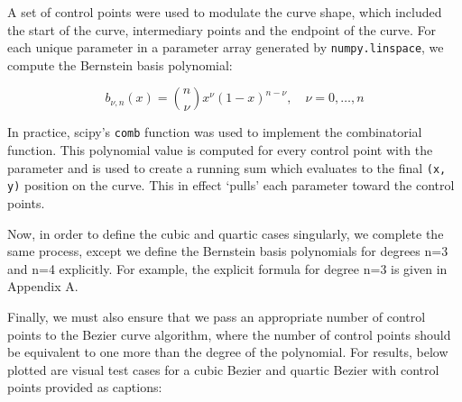 \documentclass[10pt,a4paper]{article}
\begin{document}
A set of control points were used to modulate the curve shape, which included the start of the curve, intermediary points and the endpoint of the curve. For each unique parameter in a parameter array generated by \texttt{numpy.linspace}, we compute the Bernstein basis polynomial:

\begin{equation}
b_{\nu,n}(x) = \binom{n}{\nu} x^{\nu} (1-x)^{n-\nu}, \quad \nu = 0, \ldots, n
\end{equation}

In practice, scipy's \texttt{comb} function was used to implement the combinatorial function. This polynomial value is computed for every control point with the parameter and is used to create a running sum which evaluates to the final \texttt{(x, y)} position on the curve. This in effect ‘pulls’ each parameter toward the control points.

Now, in order to define the cubic and quartic cases singularly, we complete the same process, except we define the Bernstein basis polynomials for degrees n=3 and n=4 explicitly. For example, the explicit formula for degree n=3 is given in Appendix A.

Finally, we must also ensure that we pass an appropriate number of control points to the Bezier curve algorithm, where the number of control points should be equivalent to one more than the degree of the polynomial. For results, below plotted are visual test cases for a cubic Bezier and quartic Bezier with control points provided as captions:
\end{document}
